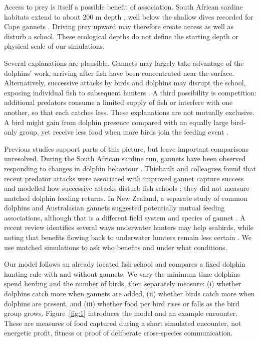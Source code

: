 \documentclass[10pt,a4paper,twocolumn]{article}
\begin{document}
Access to prey is itself a possible benefit of association. South African sardine habitats extend to about 200 m depth \citep{sanbi2018}, well below the shallow dives recorded for Cape gannets \citep{ropert2004}. Driving prey upward may therefore create access as well as disturb a school. These ecological depths do not define the starting depth or physical scale of our simulations.

Several explanations are plausible. Gannets may largely take advantage of the dolphins' work, arriving after fish have been concentrated near the surface. Alternatively, successive attacks by birds and dolphins may disrupt the school, exposing individual fish to subsequent hunters \citep{lett2014,thiebault2016}. A third possibility is competition: additional predators consume a limited supply of fish or interfere with one another, so that each catches less. These explanations are not mutually exclusive. A bird might gain from dolphin presence compared with an equally large bird-only group, yet receive less food when more birds join the feeding event \citep{licht2026}.

Previous studies support parts of this picture, but leave important comparisons unresolved. During the South African sardine run, gannets have been observed responding to changes in dolphin behaviour \citep{odonoghue2009}. Thiebault and colleagues found that recent predator attacks were associated with improved gannet capture success and modelled how successive attacks disturb fish schools \citep{thiebault2016}; they did not measure matched dolphin feeding returns. In New Zealand, a separate study of common dolphins and Australasian gannets suggested potentially mutual feeding associations, although that is a different field system and species of gannet \citep{stockin2022}. A recent review identifies several ways underwater hunters may help seabirds, while noting that benefits flowing back to underwater hunters remain less certain \citep{licht2026}. We use matched simulations to ask who benefits and under what conditions.

Our model follows an already located fish school and compares a fixed dolphin hunting rule with and without gannets. We vary the minimum time dolphins spend herding and the number of birds, then separately measure: (i) whether dolphins catch more when gannets are added, (ii) whether birds catch more when dolphins are present, and (iii) whether food per bird rises or falls as the bird group grows. Figure~\ref{fig:1} introduces the model and an example encounter. These are measures of food captured during a short simulated encounter, not energetic profit, fitness or proof of deliberate cross-species communication.
\end{document}
